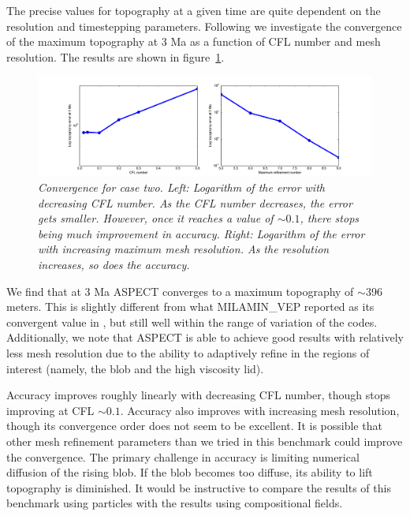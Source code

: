 \documentclass{article}
\newcommand{\aspect}{\textsc{ASPECT}}
\begin{document}
The precise values for topography at a given time are quite dependent on the resolution and
timestepping parameters. Following \cite{CSG12} we investigate the convergence of the maximum 
topography at 3 Ma as a function of CFL number and mesh resolution.  The results are shown in 
figure~\ref{fig:crameri-benchmark-convergence}. 

\begin{figure}
  \begin{center}
    \includegraphics[width=1.0\textwidth]{cookbooks/benchmarks/crameri/crameri_2_convergence.pdf}
  \end{center}
  \caption{\it Convergence for case two.  Left: Logarithm of the error with decreasing CFL number. 
As the CFL number decreases, the error gets smaller. However, once it reaches a value of $\sim0.1$, there
stops being much improvement in accuracy. Right: Logarithm of the error with increasing maximum mesh 
resolution. As the resolution increases, so does the accuracy.}
  \label{fig:crameri-benchmark-convergence}
\end{figure}

We find that at 3 Ma \aspect{}  converges to a maximum topography of $\sim$396 meters. 
This is slightly different from what MILAMIN\_VEP reported as its convergent value in \cite{CSG12},
but still well within the range of variation of the codes. Additionally, we note that \aspect{}
is able to achieve good results with relatively less mesh resolution due to the ability 
to adaptively refine in the regions of interest (namely, the blob and the high viscosity lid).

Accuracy improves roughly linearly with decreasing CFL number, though stops improving at CFL $\sim 0.1$.
Accuracy also improves with increasing mesh resolution, though its convergence order does not seem 
to be excellent.  It is possible that other mesh refinement parameters than we tried in this benchmark 
could improve the convergence. The primary challenge in accuracy is limiting numerical diffusion 
of the rising blob. If the blob becomes too diffuse, its ability to lift topography is diminished.
It would be instructive to compare the results of this benchmark using particles with the 
results using compositional fields.
\end{document}

